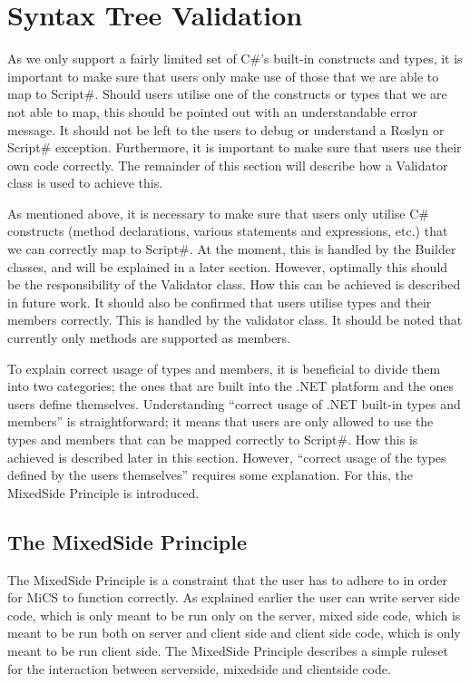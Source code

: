 \section{Syntax Tree Validation} %
\label{sec:syntax_tree_validation}
	As we only support a fairly limited set of C\#’s built-in constructs and types, it is important to make sure that users only make use of those that we are able to map to Script\#. Should users utilise one of the constructs or types that we are not able to map, this should be pointed out with an understandable error message. It should not be left to the users to debug or understand a Roslyn or Script\# exception. Furthermore, it is important to make sure that users use their own code correctly. The remainder of this section will describe how a Validator class is used to achieve this.

	As mentioned above, it is necessary to make sure that users only utilise C\# constructs (method declarations, various statements and expressions, etc.) that we can correctly map to Script\#. At the moment, this is handled by the Builder classes, and will be explained in a later section. However, optimally this should be the responsibility of the Validator class. How this can be achieved is described in future work. It should also be confirmed that users utilise types and their members correctly. This is handled by the validator class. It should be noted that currently only methods are supported as members. 

	To explain correct usage of types and members, it is beneficial to divide them into two categories; the ones that are built into the .NET platform and the ones users define themselves. Understanding “correct usage of .NET built-in types and members” is straightforward; it means that users are only allowed to use the types and members that can be mapped correctly to Script\#. How this is achieved is described later in this section. However, “correct usage of the types defined by the users themselves” requires some explanation. For this, the MixedSide Principle is introduced.

	\subsection{The MixedSide Principle} %
	\label{sub:the_mixedside_principle}
		The MixedSide Principle is a constraint that the user has to adhere to in order for MiCS to function correctly. As explained earlier the user can write server side code, which is only meant to be run only on the server, mixed side code, which is meant to be run both on server and client side and client side code, which is only meant to be run client side. The MixedSide Principle describes a simple ruleset for the interaction between serverside, mixedside and clientside code.

